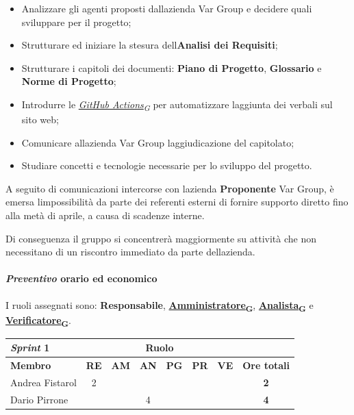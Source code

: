 \documentclass[12pt, a4paper]{article}
\newcommand{\urlglossario}{https://skynetunigroup.github.io/Code_Guardian/Documentazione/PB/glossario_v2.0.0.pdf} %
\newcommand{\glo}[2]{\href{\urlglossario\#nameddest=#2}{#1\textsubscript{G}}}
\begin{document}
{\begin{itemize}
\item
  Analizzare gli agenti proposti dall\textquotesingle azienda Var Group e
  decidere quali sviluppare per il progetto;
\item
  Strutturare ed iniziare la stesura dell\textquotesingle \textbf{Analisi dei Requisiti};
\item
  Strutturare i capitoli dei documenti: \textbf{Piano di Progetto},
  \textbf{Glossario} e \textbf{Norme di Progetto};
\item
  Introdurre le \textit{\glo{GitHub Actions}{github-actions}} per automatizzare
  l\textquotesingle aggiunta dei verbali sul sito web;
\item
  Comunicare all\textquotesingle azienda Var Group
  l\textquotesingle aggiudicazione del capitolato;
\item
  Studiare concetti e tecnologie necessarie per lo sviluppo del
  progetto.
\end{itemize}

A seguito di comunicazioni intercorse con l\textquotesingle azienda
\textbf{Proponente} Var Group, è emersa l\textquotesingle impossibilità da parte
dei referenti esterni di fornire supporto diretto fino alla metà di
aprile, a causa di scadenze interne.

Di conseguenza il gruppo si concentrerà maggiormente su attività che non
necessitano di un riscontro immediato da parte
dell\textquotesingle azienda.
\paragraph{\textit{Preventivo} orario ed economico}

I ruoli assegnati sono: \textbf{Responsabile}, \textbf{\glo{Amministratore}{amministratore}}, \textbf{\glo{Analista}{analista}} e \textbf{\glo{Verificatore}{verificatore}}.
\begin{table}[H]
    \centering
    \renewcommand{\arraystretch}{1.3}
    \begin{tabularx}{0.9\textwidth}{|X|c|c|c|c|c|c|c|}
        \hline
        \textbf{\textit{Sprint} 1} & \multicolumn{6}{|c|}{\textbf{Ruolo}} & \\ \hline
        \textbf{Membro} &\textbf{RE} & \textbf{AM} & \textbf{AN} & \textbf{PG} & \textbf{PR} & \textbf{VE} & \textbf{Ore totali} \\ \hline
        Andrea Fistarol & 2 & & & & & & \textbf{2} \\ \hline
        Dario Pirrone & & & 4 & & & & \textbf{4} \\ \hline
  

\end{tabularx}
\end{table}}
\end{document}
